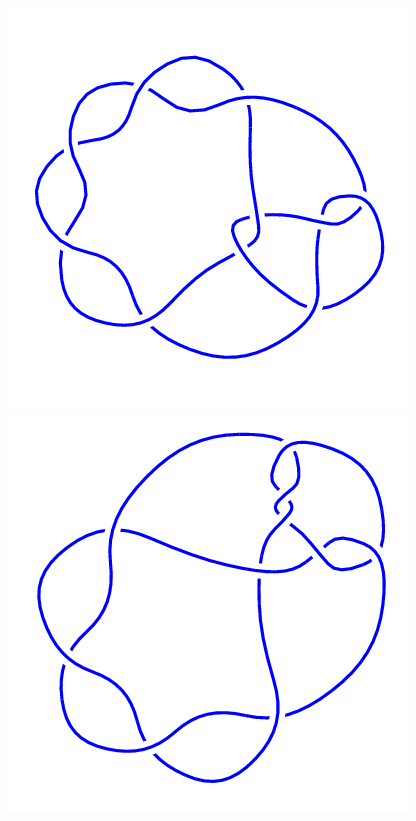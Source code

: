\begin{figure}[H]
    \begin{minipage}[b]{.18\linewidth}
        \centering
        \includegraphics[width=\linewidth]{../data/10_47.png}
    \end{minipage}
    \begin{minipage}[b]{.18\linewidth}
        \centering
        \includegraphics[width=\linewidth]{../data/10_48.png}

\end{minipage}
\end{figure}
